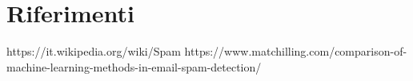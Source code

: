 \section*{Riferimenti}
https://it.wikipedia.org/wiki/Spam
https://www.matchilling.com/comparison-of-machine-learning-methods-in-email-spam-detection/